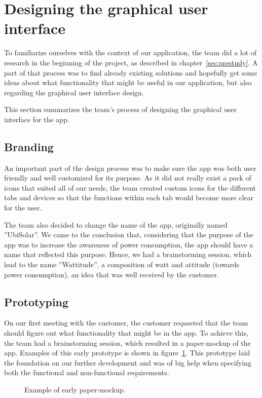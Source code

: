 \section{Designing the graphical user interface}
To familiarize ourselves with the context of our application, the team did a lot of research in the beginning of the project, as described in chapter~\ref{sec:prestudy}. A part of that process was to find already existing solutions and hopefully get some ideas about what functionality that might be useful in our application, but also regarding the graphical user interface design.

This section summarizes the team's process of designing the graphical user interface for the app.

\subsection{Branding}
An important part of the design process was to make sure the app was both user friendly and well customized for its purpose. As it did not really exist a pack of icons that suited all of our needs, the team created custom icons for the different tabs and devices so that the functions within each tab would become more clear for the user.

The team also decided to change the name of the app, originally named ''UbiSolar''. We came to the conclusion that, considering that the purpose of the app was to increase the awareness of power consumption, the app should have a name that reflected this purpose. Hence, we had a brainstorming session, which lead to the name ''Wattitude'', a composition of watt and attitude (towards power consumption), an idea that was well received by the customer.



\subsection{Prototyping}
On our first meeting with the customer, the customer requested that the team should figure out what functionality that might be in the app. To achieve this, the team had a brainstorming session, which resulted in a paper-mockup of the app. Examples of this early prototype is shown in figure~\ref{fig:designPaperProto}. This prototype laid the foundation on our further development and was of big help when specifying both the functional and non-functional requirements.

\begin{figure}[H]
  \centering
\quad
\caption{Example of early paper-mockup.}
\label{fig:designPaperProto}
\end{figure}

